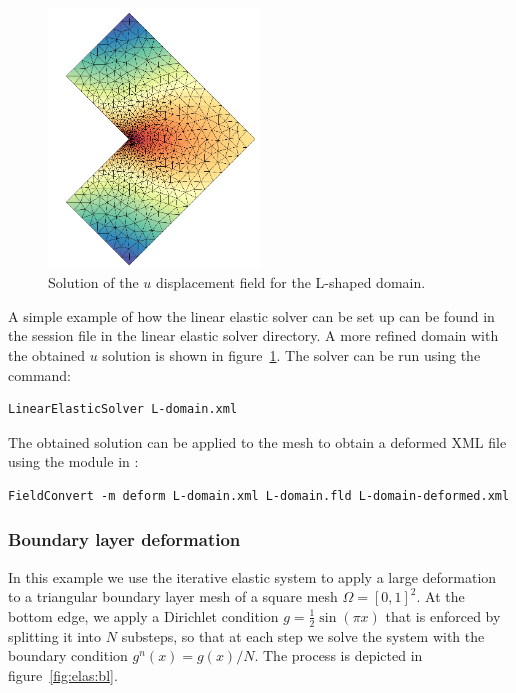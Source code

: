 \begin{figure}
  \begin{center}
    \includegraphics[width=0.5\textwidth]{img/l-shape}
  \end{center}
  \caption{Solution of the $u$ displacement field for the L-shaped domain.}
  \label{fig:elas:ldomain}
\end{figure}

A simple example of how the linear elastic solver can be set up can be found in
the  session file in the linear elastic solver
directory. A more refined domain with the obtained $u$ solution is shown in
figure~\ref{fig:elas:ldomain}. The solver can be run using the command:

\begin{lstlisting}[style=BashInputStyle]
  LinearElasticSolver L-domain.xml
\end{lstlisting}

The obtained solution  can be applied to the mesh to obtain
a deformed XML file using the  module in :

\begin{lstlisting}[style=BashInputStyle]
  FieldConvert -m deform L-domain.xml L-domain.fld L-domain-deformed.xml
\end{lstlisting}

\subsubsection{Boundary layer deformation}

In this example we use the iterative elastic system to apply a large deformation
to a triangular boundary layer mesh of a square mesh $\Omega = [0,1]^2$. At the
bottom edge, we apply a Dirichlet condition $g=\tfrac{1}{2}\sin(\pi x)$ that is
enforced by splitting it into $N$ substeps, so that at each step we solve the
system with the boundary condition $g^n(x) = g(x)/N$. The process is depicted in
figure~\ref{fig:elas:bl}.

